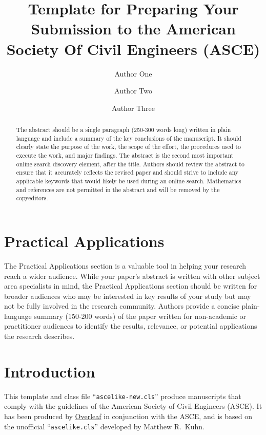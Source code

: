 \documentclass[Journal,letterpaper,NoLineNumbers]{ascelike-new}
\begin{document}
\title{Template for Preparing Your Submission to the American Society Of Civil Engineers (ASCE)}

\author[1]{Author One}
\author[2]{Author Two}
\author[3]{Author Three}


\maketitle

\begin{abstract}
The abstract should be a single paragraph (250-300 words long) written in plain language and include a summary of the key conclusions of the manuscript. It should clearly state the purpose of the work, the scope of the effort, the procedures used to execute the work, and major findings. The abstract is the second most important online search discovery element, after the title. Authors should review the abstract to ensure that it accurately reflects the revised paper and should strive to include any applicable keywords that would likely be used during an online search. Mathematics and references are not permitted in the abstract and will be removed by the copyeditors.
\end{abstract}

\section{Practical Applications}
The Practical Applications section is a valuable tool in helping your research reach a wider audience. While your paper’s abstract is written with other subject area specialists in mind, the Practical Applications section should be written for broader audiences who may be interested in key results of your study but may not be fully involved in the research community. Authors provide a concise plain-language summary (150-200 words) of the paper written for non-academic or practitioner audiences to identify the results, relevance, or potential applications the research describes.



\section{Introduction}
This template and class file ``\texttt{ascelike-new.cls}'' produce manuscripts that comply with the guidelines of the American Society of Civil Engineers (ASCE). It has been produced by \href{https://www.overleaf.com}{Overleaf} in conjunction with the ASCE, and is based on the unofficial ``\texttt{ascelike.cls}'' developed by Matthew R.~Kuhn.
\end{document}
